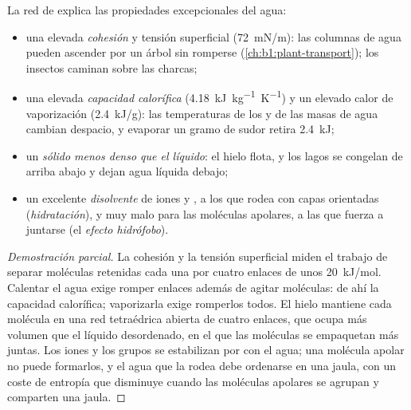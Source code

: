 \begin{proposition}\label{prop:b1:water-small-molecules:properties}
La red de  explica las propiedades excepcionales del agua:
\begin{itemize}
  \item una elevada \emph{cohesión} y tensión superficial (\qty{72}{mN/m}):
        las columnas de agua pueden ascender por un árbol sin romperse
        (\cref{ch:b1:plant-transport}); los insectos caminan sobre las
        charcas;
  \item una elevada \emph{capacidad calorífica}
        (\qty{4.18}{kJ.kg^{-1}.K^{-1}}) y un elevado calor de vaporización
        (\qty{2.4}{kJ/g}): las temperaturas de los  y de las
        masas de agua cambian despacio, y evaporar un gramo de sudor
        retira \qty{2.4}{kJ};
  \item un \emph{sólido menos denso que el líquido}: el hielo flota, y los
        lagos se congelan de arriba abajo y dejan agua líquida debajo;
  \item un excelente \emph{disolvente} de iones y , a los
        que rodea con capas orientadas (\emph{hidratación}), y muy malo
        para las moléculas apolares, a las que fuerza a juntarse (el
        \emph{efecto hidrófobo}).
\end{itemize}
\end{proposition}
\begin{proof}[Demostración parcial]
La cohesión y la tensión superficial miden el trabajo de separar moléculas
retenidas cada una por cuatro enlaces de unos \qty{20}{kJ/mol}. Calentar el
agua exige romper enlaces además de agitar moléculas: de ahí la capacidad
calorífica; vaporizarla exige romperlos todos. El hielo mantiene cada
molécula en una red tetraédrica abierta de cuatro enlaces, que ocupa más
volumen que el líquido desordenado, en el que las moléculas se empaquetan
más juntas. Los iones y los grupos  se estabilizan por  con el agua; una molécula apolar no puede formarlos, y el agua que
la rodea debe ordenarse en una jaula, con un coste de entropía que
disminuye cuando las moléculas apolares se agrupan y comparten una jaula.
\end{proof}

